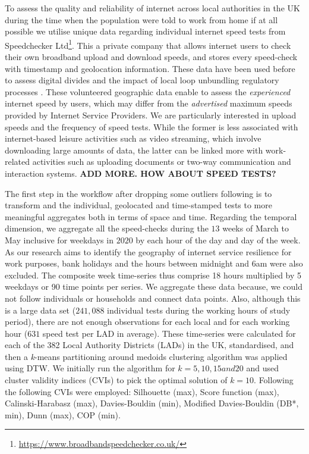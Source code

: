 \documentclass[]{interact}
\theoremstyle{plain}%
\theoremstyle{definition}
\theoremstyle{remark}
\begin{document}
To assess the quality and reliability of internet across local
authorities in the UK during the time when the population were told to
work from home if at all possible we utilise unique data regarding
individual internet speed tests from Speedchecker Ltd\footnote{\url{https://www.broadbandspeedchecker.co.uk/}}.
This a private company that allows internet users to check their own
broadband upload and download speeds, and stores every speed-check with
timestamp and geolocation information. These data have been used before
to assess digital divides \citep{riddlesden2014broadband} and the impact
of local loop unbundling regulatory processes
\citep{nardotto2015unbundling}. These volunteered geographic data enable
to assess the \emph{experienced} internet speed by users, which may
differ from the \emph{advertised} maximum speeds provided by Internet
Service Providers. We are particularly interested in upload speeds and
the frequency of speed tests. While the former is less associated with
internet-based leisure activities such as video streaming, which involve
downloading large amounts of data, the latter can be linked more with
work-related activities such as uploading documents or two-way
communication and interaction systems. \textbf{ADD MORE. HOW ABOUT SPEED
TESTS?}

The first step in the workflow after dropping some outliers following
\citet{riddlesden2014broadband} is to transform and the individual,
geolocated and time-stamped tests to more meaningful aggregates both in
terms of space and time. Regarding the temporal dimension, we aggregate
all the speed-checks during the \(13\) weeks of March to May inclusive
for weekdays in \(2020\) by each hour of the day and day of the week. As
our research aims to identify the geography of internet service
resilience for work purposes, bank holidays and the hours between
midnight and 6am were also excluded. The composite week time-series thus
comprise 18 hours multiplied by 5 weekdays or 90 time points per series.
We aggregate these data because, we could not follow individuals or
households and connect data points. Also, although this is a large data
set (\(241,088\) individual tests during the working hours of study
period), there are not enough observations for each local and for each
working hour (\(631\) speed test per LAD in average). These time-series
were calculated for each of the 382 Local Authority Districts (LADs) in
the UK, standardised, and then a \emph{k}-means partitioning around
medoids clustering algorithm was applied using DTW. We initially run the
algorithm for \(k = 5, 10, 15 and 20\) and used cluster validity indices
(CVIs) to pick the optimal solution of \(k = 10\). Following
\citet{sardatime} the following CVIs were employed: Silhouette (max),
Score function (max), Calinski-Harabasz (max), Davies-Bouldin (min),
Modified Davies-Bouldin (DB*, min), Dunn (max), COP (min).
\end{document}
